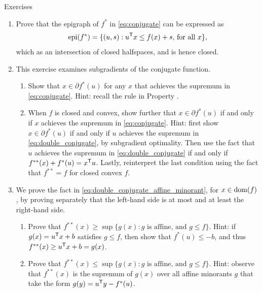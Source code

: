 \begin{xcb}{Exercises}
\begin{enumerate}[label=\thechapter.\arabic*]
\settowidth{\leftmargini}{0.00.\hskip\labelsep}
\item \label{ex:conjugate_closed}
  Prove that the epigraph of $f^*$ in \eqref{eq:conjugate} can be expressed as  
  \[
  \operatorname{epi}(f^*) = \{ (u,s) : u^{\mathsf{T}} x \leq f(x) + s, \, \text{for all $x$} \},
  \]
  which as an intersection of closed halfspaces, and is hence closed. 

\item \label{ex:conjugate_subgradients}
  This exercise examines subgradients of the conjugate function.

\begin{enumerate}[label=\alph*.]
\item Show that $x \in \partial f^*(u)$ for any $x$ that achieves the supremum
  in \eqref{eq:conjugate}. Hint: recall the rule in Property
  . 

\item When $f$ is closed and convex, show further that $x \in \partial f^*(u)$
  if and only if $x$ achieves the supremum in \eqref{eq:conjugate}. Hint: first
  show $x \in \partial f^*(u)$ if and only if $u$ achieves the supremum in
  \eqref{eq:double_conjugate}, by subgradient optimality. Then use the fact that
  $u$ achieves the supremum in \eqref{eq:double_conjugate} if and only if
  $f^{**}(x) + f^*(u) = x^{\mathsf{T}} u$. Lastly, reinterpret the last condition using
  the fact that $f^{**} = f$ for closed convex $f$. 
\end{enumerate}

\item \label{ex:double_conjugate_affine_minorant}
  We prove the fact in \eqref{eq:double_conjugate_affine_minorant}, for $x \in
  \operatorname{dom}(f)$, by proving separately that the left-hand side is at most and at
  least the right-hand side.     

\begin{enumerate}[label=\alph*.]
\item Prove that $f^{**}(x) \geq \sup \{ g(x) : \text{$g$ is affine, and $g \leq
    f$} \}$. Hint: if $g(x) = u^{\mathsf{T}} x + b$ satisfies $g \leq f$, then show that
  $f^*(u) \leq -b$, and thus $f^{**}(x) \geq u^{\mathsf{T}} x + b = g(x)$. 
  
\item Prove that $f^{**}(x) \leq \sup \{ g(x) : \text{$g$ is affine, and $g \leq
    f$} \}$. Hint: observe that $f^{**}(x)$ is the supremum of $g(x)$ over all
  affine minorants $g$ that take the form $g(y) = u^{\mathsf{T}} y - f^*(u)$.  
\end{enumerate}


\end{enumerate}
\end{xcb}
